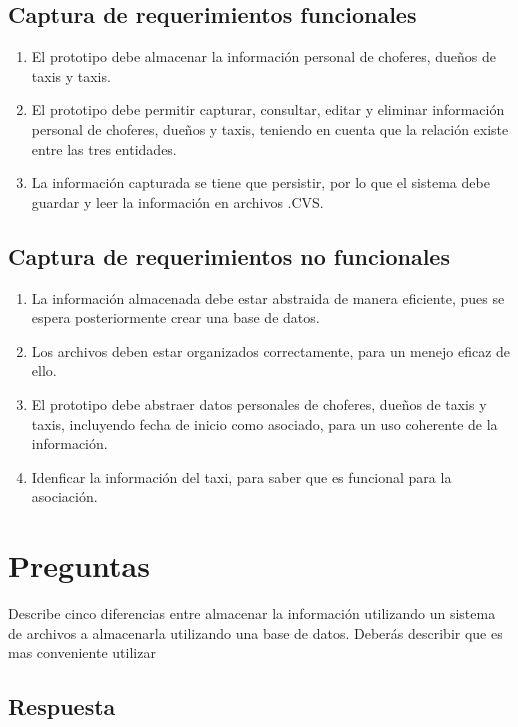 \documentclass[
	10pt, %
	spanish %
]{fphw}
\begin{document}
\subsection*{Captura de requerimientos funcionales}
\begin{enumerate}
	\item El prototipo debe almacenar la información  personal de choferes, dueños de taxis y taxis.
	\item El prototipo debe permitir capturar, consultar, editar y eliminar información personal de choferes, dueños y taxis, 		teniendo en cuenta que la relación existe entre las tres entidades.
	\item La información capturada se tiene que persistir, por lo que el sistema debe guardar y leer la información en 				archivos .CVS.
\end{enumerate}
\subsection*{Captura de requerimientos no funcionales}
\begin{enumerate}
	\item La información almacenada debe estar abstraida de manera eficiente, pues se espera posteriormente crear una base de 
	datos.
	\item Los archivos deben estar organizados correctamente, para un menejo eficaz de ello. 
	\item El prototipo debe abstraer datos personales de choferes, dueños de taxis y taxis, incluyendo fecha de inicio como 		asociado, para un uso coherente de la información.
	\item Idenficar la información del taxi, para saber que es funcional para la asociación.	
\end{enumerate}

\section*{Preguntas}

\begin{problem}
Describe cinco diferencias entre almacenar la información utilizando un sistema de archivos a almacenarla utilizando una base
de datos. Deberás describir que es mas conveniente utilizar
\end{problem}

\subsection*{Respuesta}
\end{document}
